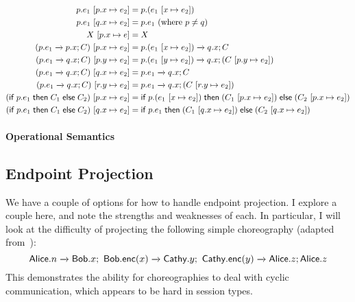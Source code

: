 \documentclass{article}
\theoremstyle{definition}
\newcommand{\ett}{\textsf{true}}
\newcommand{\eff}{\textsf{false}}
\newcommand{\To}{\Rightarrow}
\newcommand{\subst}[3]{#1~[#2 \mapsto #3]}
\newcommand{\own}[2]{#1.#2}
\newcommand{\send}[3][]{#2\nolinebreak \mathrel{\xrightarrow{#1}}\nolinebreak #3}
\newcommand{\cif}[3]{\textsf{if}~#1 \mathrel{\textsf{then}}\nolinebreak #2 \mathrel{\textsf{else}}\nolinebreak #3}
\newcommand{\clet}[2]{\textsf{let}~#1\nolinebreak =\nolinebreak #2 \mathrel{\textsf{in}}}
\begin{document}
\begin{align*}
  \subst{p.e_1}{\own{p}{x}}{e_2} &= p.(\subst{e_1}{x}{e_2})\\
  \subst{p.e_1}{\own{q}{x}}{e_2} &= p.e_1~\textrm{(where $p \neq q$)}\\
  \subst{X}{\own{p}{x}}{e} &= X\\
  \subst{(\send{\own{p}{e_1}}{\own{p}{x}}; C)}{\own{p}{x}}{e_2} &= \send{\own{p}{(\subst{e_1}{x}{e_2})}}{\own{q}{x}}; C\\
  \subst{(\send{\own{p}{e_1}}{\own{q}{x}}; C)}{\own{p}{y}}{e_2} &= \send{\own{p}{(\subst{e_1}{y}{e_2})}}{\own{q}{x}}; (\subst{C}{\own{p}{y}}{e_2})\\
  \subst{(\send{\own{p}{e_1}}{\own{q}{x}}; C)}{\own{q}{x}}{e_2} &= \send{\own{p}{e_1}}{\own{q}{x}}; C\\
  \subst{(\send{\own{p}{e_1}}{\own{q}{x}}; C)}{\own{r}{y}}{e_2} &= \send{\own{p}{e_1}}{\own{q}{x}}; (\subst{C}{\own{r}{y}}{e_2})\\
  \subst{(\cif{\own{p}{e_1}}{C_1}{C_2})}{\own{p}{x}}{e_2} &= \cif{\own{p}{(\subst{e_1}{x}{e_2})}}{(\subst{C_1}{\own{p}{x}}{e_2})}{(\subst{C_2}{\own{p}{x}}{e_2})}\\
  \subst{(\cif{\own{p}{e_1}}{C_1}{C_2})}{\own{q}{x}}{e_2} &= \cif{\own{p}{e_1}}{(\subst{C_1}{\own{q}{x}}{e_2})}{(\subst{C_2}{\own{q}{x}}{e_2})}
\end{align*}


\paragraph{Operational Semantics}
\noindent{}

\subsection{Endpoint Projection}

We have a couple of options for how to handle endpoint projection.
I explore a couple here, and note the strengths and weaknesses of each.
In particular, I will look at the difficulty of projecting the following simple choreography (adapted from~\citet{AschieriG20}):
$$\send{\own{\textsf{Alice}}{n}}{\own{\textsf{Bob}}{x}};~\send{\own{\textsf{Bob}}{\textsf{enc}(x)}}{\own{\textsf{Cathy}}{y}};~\send{\own{\textsf{Cathy}}{\textsf{enc}(y)}}{\own{\textsf{Alice}}{z}}; \own{\textsf{Alice}}{z}$$
This demonstrates the ability for choreographies to deal with cyclic communication, which appears to be hard in session types.
\end{document}
